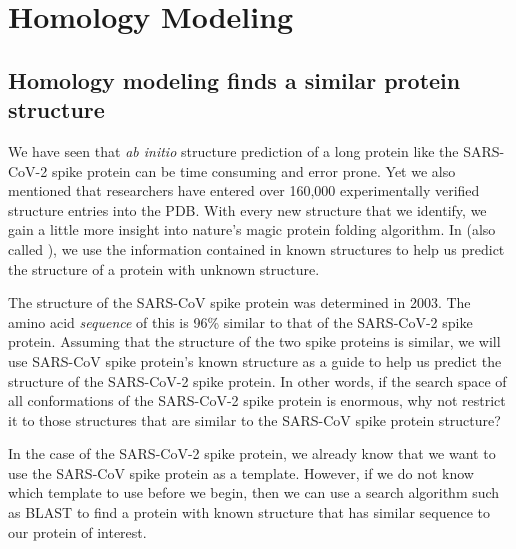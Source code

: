 \begin{qbox}\end{qbox}

\FloatBarrier
{}

\section{Homology Modeling}
\label{sec:homology}
\subsection{Homology modeling finds a similar protein structure}

We have seen that \textit{ab initio} structure prediction of a long protein like the SARS-CoV-2 spike protein can be time consuming and error prone. Yet we also mentioned that researchers have entered over 160,000 experimentally verified structure entries into the PDB. With every new structure that we identify, we gain a little more insight into nature's magic protein folding algorithm. In  (also called ), we use the information contained in known structures to help us predict the structure of a protein with unknown structure.

The structure of the SARS-CoV spike protein was determined in 2003. The amino acid \textit{sequence} of this  is 96\% similar to that of the SARS-CoV-2 spike protein. Assuming that the structure of the two spike proteins is similar, we will use SARS-CoV spike protein's known structure as a guide to help us predict the structure of the SARS-CoV-2 spike protein. In other words, if the search space of all conformations of the SARS-CoV-2 spike protein is enormous, why not restrict it to those structures that are similar to the SARS-CoV spike protein structure?

In the case of the SARS-CoV-2 spike protein, we already know that we want to use the SARS-CoV spike protein as a template. However, if we do not know which template to use before we begin, then we can use a search algorithm such as BLAST to find a protein with known structure that has similar sequence to our protein of interest.

